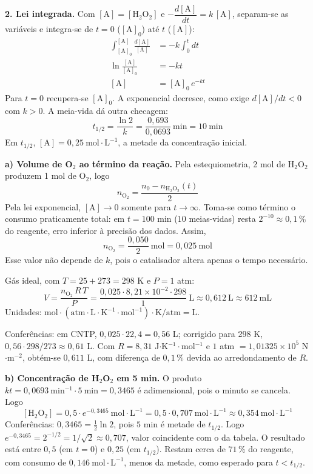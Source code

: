 \documentclass{article}%
\begin{document}
\textbf{2. Lei integrada.} Com $[\mathrm{A}]=[\mathrm{H_2O_2}]$ e $-\dfrac{d[\mathrm{A}]}{dt}=k\,[\mathrm{A}]$, separam-se as variáveis e integra-se de $t=0$ ($[\mathrm{A}]_0$) até $t$ ($[\mathrm{A}]$):
\begin{align*}
\int_{[\mathrm{A}]_0}^{[\mathrm{A}]}\frac{d[\mathrm{A}]}{[\mathrm{A}]}&=-k\int_0^{t}dt\\
\ln\frac{[\mathrm{A}]}{[\mathrm{A}]_0}&=-kt\\
[\mathrm{A}]&=[\mathrm{A}]_0\,e^{-kt}
\end{align*}
Para $t=0$ recupera-se $[\mathrm{A}]_0$. A exponencial decresce, como exige $d[\mathrm{A}]/dt<0$ com $k>0$. A meia-vida dá outra checagem:
\[
t_{1/2}=\frac{\ln 2}{k}=\frac{0{,}693}{0{,}0693}\ \mathrm{min}=10\ \mathrm{min}
\]
Em $t_{1/2}$, $[\mathrm{A}]=0{,}25\ \mathrm{mol\cdot L^{-1}}$, a metade da concentração inicial.

\textbf{a) Volume de O$_2$ ao término da reação.} Pela estequiometria, 2 mol de H$_2$O$_2$ produzem 1 mol de O$_2$, logo
\[
n_{\mathrm{O_2}}=\frac{n_0-n_{\mathrm{H_2O_2}}(t)}{2}
\]
Pela lei exponencial, $[\mathrm{A}]\to 0$ somente para $t\to\infty$. Toma-se como término o consumo praticamente total: em $t=100$ min ($10$ meias-vidas) resta $2^{-10}\approx 0{,}1\,\%$ do reagente, erro inferior à precisão dos dados. Assim,
\[
n_{\mathrm{O_2}}=\frac{0{,}050}{2}\ \mathrm{mol}=0{,}025\ \mathrm{mol}
\]
Esse valor não depende de $k$, pois o catalisador altera apenas o tempo necessário.

Gás ideal, com $T=25+273=298$ K e $P=1$ atm:
\[
V=\frac{n_{\mathrm{O_2}}\,R\,T}{P}=\frac{0{,}025\cdot 8{,}21\times10^{-2}\cdot 298}{1}\ \mathrm{L}\approx 0{,}612\ \mathrm{L}\approx 612\ \mathrm{mL}
\]
Unidades: $\mathrm{mol\cdot(atm\cdot L\cdot K^{-1}\cdot mol^{-1})\cdot K/atm=L}$.

Conferências: em CNTP, $0{,}025\cdot 22{,}4=0{,}56$ L; corrigido para 298 K, $0{,}56\cdot 298/273\approx 0{,}61$ L. Com $R=8{,}31$ J$\cdot$K$^{-1}\cdot$mol$^{-1}$ e $1$ atm $=1{,}01325\times10^{5}$ N$\cdot$m$^{-2}$, obtém-se $0{,}611$ L, com diferença de $0{,}1\,\%$ devida ao arredondamento de $R$.

\textbf{b) Concentração de H$_2$O$_2$ em 5 min.} O produto $kt=0{,}0693\ \mathrm{min^{-1}}\cdot 5\ \mathrm{min}=0{,}3465$ é adimensional, pois o minuto se cancela. Logo
\[
[\mathrm{H_2O_2}]=0{,}5\cdot e^{-0{,}3465}\ \mathrm{mol\cdot L^{-1}}=0{,}5\cdot 0{,}707\ \mathrm{mol\cdot L^{-1}}\approx 0{,}354\ \mathrm{mol\cdot L^{-1}}
\]
Conferências: $0{,}3465=\tfrac{1}{2}\ln 2$, pois $5$ min é metade de $t_{1/2}$. Logo $e^{-0{,}3465}=2^{-1/2}=1/\sqrt{2}\approx 0{,}707$, valor coincidente com o da tabela. O resultado está entre $0{,}5$ (em $t=0$) e $0{,}25$ (em $t_{1/2}$). Restam cerca de $71\,\%$ do reagente, com consumo de $0{,}146\ \mathrm{mol\cdot L^{-1}}$, menos da metade, como esperado para $t<t_{1/2}$.
\end{document}
